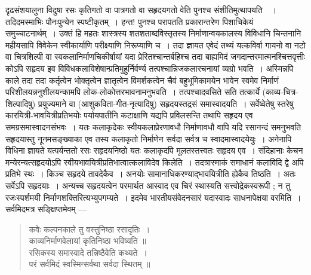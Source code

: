 {\dev दृढसंशयालुना विदुषा रसः कृतिगतो वा पात्रगतो वा सहृदयगतो वेति पुनश्च संशीतिमुत्थाप\-यति}~{\dev~। तदिदमस्माभिः पौनःपुन्येन स्पष्टीकृतम्~। हन्त! पुनश्च परापतति प्रकारान्तरेण पिशाचिकेयं समुच्चाटनार्थम्~। उक्तं हि महतः शास्त्रस्य शतशताब्दविस्तृतस्य निर्माणान्वय\-कालस्य विविधानि चिन्तनानि महीयसापि विवेकेन स्वीकार्याणि परीक्ष्याणि निरू\-प्याणि च~। तदा ज्ञायत एवेदं तथ्यं यत्कविर्वा गायनो वा नटो वा चित्रशिल्पी वा स्वकलानिर्माण\-चिकीर्षायां यदा प्रेरितश्चान्तर्बहिश्च तदा बाह्यमिदं जगदान्तरमात्मनश्चित्तवृत्तीः कोऽपि सहृदय इव विविधकलाविशेषान्प्रतिमुहुर्निर्वर्ण्य तत्पश्चान्निजकलारचनायां व्यग्रो भवति~। अस्मिन्नपि काले तदा तदा कर्तृत्वेन भोक्तृत्वेन ज्ञातृत्वेन विमर्शकत्वेन चैवं बहुभूमिकामयेन भावेन स्वमेव निर्माणं परिशीलयन्ननुशीलयन्कामपि लोक-लोकोत्तरभावनामनुभवति~। तत्पश्चादवसिते सति तत्कार्ये (काव्य-चित्र-शिल्पादिषु) प्रयुज्यमाने वा (आशुकविता-गीत-नृत्यादिषु) सहृदयस्तद्रसं समास्वादयति~। सर्वेष्वेतेषु स्तरेषु कारयित्री-भावयित्रीप्रतिभयोः पर्यायपातीनि कटाक्षाणि यद्यपि प्रविलसन्ति तथापि सहृदय एव समग्रसमास्वादनसंभवः~। यतः कलाकृदेकः स्वीय\-कलाप्रेरणावधौ निर्माणावधौ वापि यदि रसानन्दं समनुभवति सहृदयास्तु नूनमसङ्ख्याका एव तस्य कलाकृतो निर्माणेन सर्वदा सर्वत्र च स्वादमास्वादयेयुः~। अनेनापि विधिना ज्ञायते यत्पर्यन्ततो रसः सहृदयनिष्ठो यतः कलाकृदपि मूलतस्तत्त्वतः सहृदय एव~। संदिहानाः केचन मन्येरन्यत्सहृदयोऽपि स्वीयभावयित्रीप्रतिभात्वात्कलाविदेव किलेति~। तदत्रास्माकं समाधानं कलाविदि द्वे अपि प्रतिभे स्थः~। किञ्च सहृदये तावदेकैव~। अनयोः सामानाधिकरण्याद्भावयि\-त्रीति ह्येकैव तिष्ठति~। अतः सर्वेऽपि सहृदयाः~। अन्यच्च सहृदयत्वेन परमार्थत आस्वाद एव चिरं स्थास्यति सत्त्वोद्रेकस्वरूपी ; न तु रजःस्पर्शमयी निर्माणशक्तिरित्यभ्युपगम्यते~। इदमेव भारतीयसंवेदनसारं यदास्वादः साधनापेक्षया वरमिति~। सर्वमिदमत्र सङ्क्षिप्तमेवम् --- }   
\begin{quote}
{\dev कवेः कल्पनकाले तु वस्तुनिष्ठा रसादृतिः~।}\\
{\dev काव्यनिर्माणवेलायां कृतिनिष्ठा भविष्यति ॥}\\[5pt]
{\dev रसिकस्य समास्वादे तन्निष्ठैवेति कथ्यते~।}\\
{\dev परं सर्वमिदं स्वस्मिन्सर्वथा सर्वदा स्थितम् ॥}
\end{quote}

